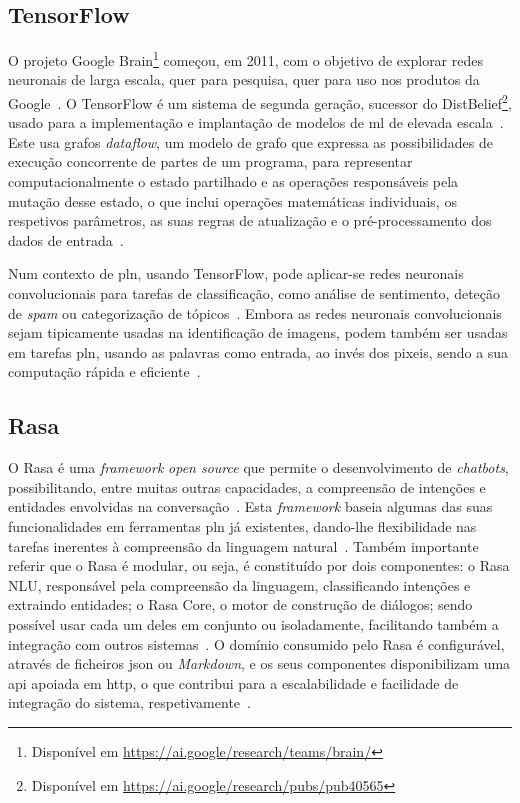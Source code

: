 \subsection{TensorFlow}
O projeto Google Brain\footnote{Disponível em \url{https://ai.google/research/teams/brain/}} começou, em 2011, com o objetivo de explorar redes neuronais de larga escala, quer para pesquisa, quer para uso nos produtos da Google~\parencite{tensorflow_largescale_machine_learning_distributed_systems}. O TensorFlow é um sistema de segunda geração, sucessor do DistBelief\footnote{Disponível em \url{https://ai.google/research/pubs/pub40565}}, usado para a implementação e implantação de modelos de \gls{ml} de elevada escala~\parencite{tensorflow_largescale_machine_learning_distributed_systems}. Este usa grafos \textit{dataflow}, um modelo de grafo que expressa as possibilidades de execução concorrente de partes de um programa, para representar computacionalmente o estado partilhado e as operações responsáveis pela mutação desse estado, o que inclui operações matemáticas individuais, os respetivos parâmetros, as suas regras de atualização e o pré-processamento dos dados de entrada~\parencite{data_flow_graphs_encyclopedia_parellel_computing, tensorflow_system_largescale_machine_learning}.

Num contexto de \gls{pln}, usando TensorFlow, pode aplicar-se redes neuronais convolucionais para tarefas de classificação, como análise de sentimento, deteção de \textit{spam} ou categorização de tópicos~\parencite{understanding_convolution_neural_networks_nlp}. Embora as redes neuronais convolucionais sejam tipicamente usadas na identificação de imagens, podem também ser usadas em tarefas \gls{pln}, usando as palavras como entrada, ao invés dos pixeis, sendo a sua computação rápida e eficiente~\parencite{understanding_convolution_neural_networks_nlp}.

\subsection{Rasa}
O Rasa é uma \textit{framework} \textit{open source} que permite o desenvolvimento de \textit{chatbots}, possibilitando, entre muitas outras capacidades, a compreensão de intenções e entidades envolvidas na conversação~\parencite{rasa_official}. Esta \textit{framework} baseia algumas das suas funcionalidades em ferramentas \gls{pln} já existentes, dando-lhe flexibilidade nas tarefas inerentes à compreensão da linguagem natural~\parencite{rasa_open_source_language_understanding}. Também importante referir que o Rasa é modular, ou seja, é constituído por dois componentes: o Rasa NLU, responsável pela compreensão da linguagem, classificando intenções e extraindo entidades; o Rasa Core, o motor de construção de diálogos; sendo possível usar cada um deles em conjunto ou isoladamente, facilitando também a integração com outros sistemas~\parencite{rasa_open_source_language_understanding, rasa_official}. O domínio consumido pelo Rasa é configurável, através de ficheiros \gls{json} ou \textit{Markdown}, e os seus componentes disponibilizam uma \gls{api} apoiada em \gls{http}, o que contribui para a escalabilidade e facilidade de integração do sistema, respetivamente~\parencite{rasa_open_source_language_understanding}.

